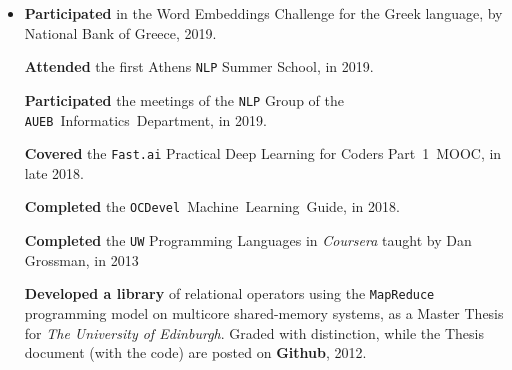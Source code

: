 \documentclass[10pt]{article}
\newenvironment{region}[1]
{{\large \textbf{#1}}
  \begin{itemize}
  }{\end{itemize}}
\begin{document}
\begin{region}{Other}

   
\item
    \textbf{Participated} in the Word Embeddings Challenge for the
    Greek language, by National Bank of Greece, 2019.
    
    \textbf{Attended} the first Athens \texttt{NLP} Summer School, in 2019.
    
    \textbf{Participated} the meetings of the \texttt{NLP} Group of the \texttt{AUEB}~Informatics~Department, in 2019.
    
    \textbf{Covered} the \texttt{Fast.ai} Practical Deep Learning for Coders  Part~1~MOOC, in late 2018.
    
    \textbf{Completed} the \texttt{OCDevel}~Machine~Learning~Guide, in 2018.
    
    \textbf{Completed} the \texttt{UW} Programming Languages in {\it Coursera} taught by Dan Grossman, in 2013 

    \textbf{Developed a library} of relational operators using the \texttt{MapReduce} programming model on multicore shared-memory systems, as a  Master Thesis for {\it The University of Edinburgh}. Graded with distinction, while the Thesis document (with the code) are posted on {\bf Github}, 2012. 




%
 \end{region}
 


%
\end{document}
